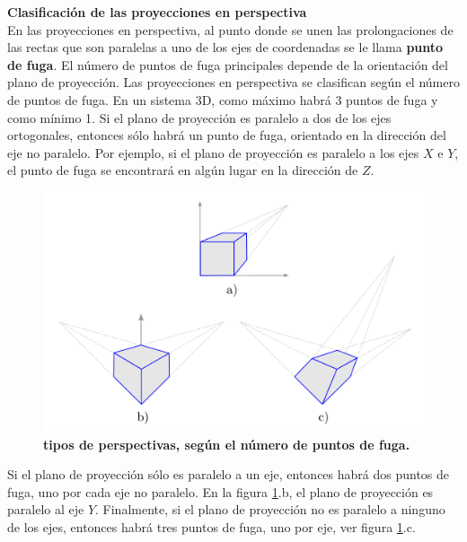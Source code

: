 \clearpage
\textbf{Clasificación de las proyecciones en perspectiva}\\
En las proyecciones en perspectiva, al punto donde se unen las prolongaciones de las rectas que son paralelas a uno de los ejes de coordenadas se le llama \textbf{punto de fuga}. El número de puntos de fuga principales depende de la orientación del plano de proyección. Las proyecciones en perspectiva se clasifican según el número de puntos de fuga. En un sistema 3D, como máximo habrá 3 puntos de fuga y como mínimo 1.
Si el plano de proyección es paralelo a dos de los ejes ortogonales, entonces sólo habrá un punto de fuga, orientado en la dirección del eje no paralelo. Por ejemplo, si el plano de proyección es paralelo a los ejes $X$ e $Y$, el punto de fuga se encontrará en algún lugar en la dirección de $Z$.


\begin{figure}[h]
    \includegraphics[width=12cm]{Img/GEO/geo-per-8.png}
    \centering
    \caption{\footnotesize{\textbf{tipos de perspectivas, según el número de puntos de fuga.}}}
    \label{geo-per8}
\end{figure}

Si el plano de proyección sólo es paralelo a un eje, entonces habrá dos puntos de fuga, uno por cada eje no paralelo. En la figura \ref{geo-per8}.b, el plano de proyección es paralelo al eje $Y$. Finalmente, si el plano de proyección no es paralelo a ninguno de los ejes, entonces habrá tres puntos de fuga, uno por eje, ver figura \ref{geo-per8}.c.

\clearpage
